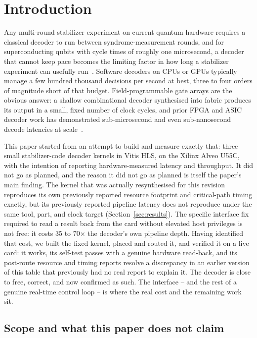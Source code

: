 \section{Introduction}\label{sec:introduction}

Any multi-round stabilizer experiment on current quantum hardware requires a classical decoder to run between syndrome-measurement rounds, and for superconducting qubits with cycle times of roughly one microsecond, a decoder that cannot keep pace becomes the limiting factor in how long a stabilizer experiment can usefully run~\cite{fowler2012surface,terhal2015qec}. Software decoders on CPUs or GPUs typically manage a few hundred thousand decisions per second at best, three to four orders of magnitude short of that budget. Field-programmable gate arrays are the obvious answer: a shallow combinational decoder synthesised into fabric produces its output in a small, fixed number of clock cycles, and prior FPGA and ASIC decoder work has demonstrated sub-microsecond and even sub-nanosecond decode latencies at scale~\cite{das2022afs,liyanage2023scalable}.

This paper started from an attempt to build and measure exactly that: three small stabilizer-code decoder kernels in Vitis HLS, on the Xilinx Alveo U55C, with the intention of reporting hardware-measured latency and throughput. It did not go as planned, and the reason it did not go as planned is itself the paper's main finding. The kernel that was actually resynthesised for this revision reproduces its own previously reported resource footprint and critical-path timing exactly, but its previously reported pipeline latency does not reproduce under the same tool, part, and clock target (Section~\ref{sec:results}). The specific interface fix required to read a result back from the card without elevated host privileges is not free: it costs 35 to 70\(\times\) the decoder's own pipeline depth. Having identified that cost, we built the fixed kernel, placed and routed it, and verified it on a live card: it works, its self-test passes with a genuine hardware read-back, and its post-route resource and timing reports resolve a discrepancy in an earlier version of this table that previously had no real report to explain it. The decoder is close to free, correct, and now confirmed as such. The interface -- and the rest of a genuine real-time control loop -- is where the real cost and the remaining work sit.

\subsection{Scope and what this paper does not claim}\label{subsec:scope}

